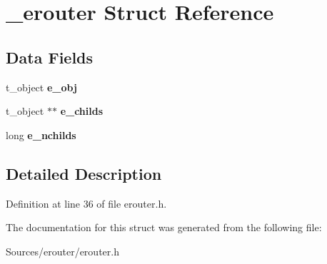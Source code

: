 \hypertarget{struct__erouter}{\section{\-\_\-erouter Struct Reference}
\label{struct__erouter}
}
\subsection*{Data Fields}
\begin{DoxyCompactItemize}
\item 
\hypertarget{struct__erouter_a337dd8dd1771ebe57e90886d4fdfe92d}{t\-\_\-object {\bfseries e\-\_\-obj}}\label{struct__erouter_a337dd8dd1771ebe57e90886d4fdfe92d}

\item 
\hypertarget{struct__erouter_a5484fdcb775740c1c4dedcd94b4580ab}{t\-\_\-object $\ast$$\ast$ {\bfseries e\-\_\-childs}}\label{struct__erouter_a5484fdcb775740c1c4dedcd94b4580ab}

\item 
\hypertarget{struct__erouter_aae6cef9e2d4de46e690ad868953d0923}{long {\bfseries e\-\_\-nchilds}}\label{struct__erouter_aae6cef9e2d4de46e690ad868953d0923}

\end{DoxyCompactItemize}


\subsection{Detailed Description}


Definition at line 36 of file erouter.\-h.



The documentation for this struct was generated from the following file\-:\begin{DoxyCompactItemize}
\item 
Sources/erouter/erouter.\-h\end{DoxyCompactItemize}
